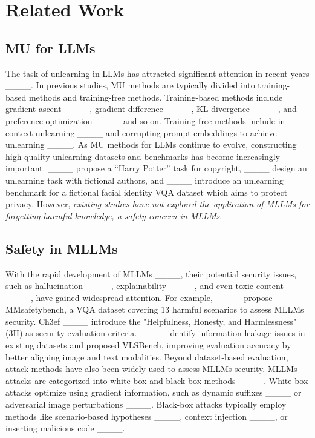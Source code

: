 \section{Related Work}
\subsection{MU for LLMs}
The task of unlearning in LLMs has attracted significant attention in recent years ____. In previous studies, MU methods are typically divided into training-based methods and training-free methods. Training-based methods include gradient ascent ____, gradient difference ____, KL divergence ____, and preference optimization ____ and so on. Training-free methods include in-context unlearning ____ and corrupting prompt embeddings to achieve unlearning ____. As MU methods for LLMs continue to evolve, constructing high-quality unlearning datasets and benchmarks has become increasingly important. ____ propose a “Harry Potter” task for copyright, ____ design an unlearning task with fictional authors, and ____ introduce an unlearning benchmark for a fictional facial identity VQA dataset which aims to protect privacy. However, \textit{existing studies have not explored the application of MLLMs for forgetting harmful knowledge, a safety concern in MLLMs}.

\subsection{Safety in MLLMs}

With the rapid development of MLLMs ____, their potential security issues, such as hallucination ____, explainability ____, and even toxic content ____, have gained widespread attention. For example, ____ propose MMsafetybench, a VQA dataset covering 13 harmful scenarios to assess MLLMs security. Ch3ef ____ introduce the "Helpfulness, Honesty, and Harmlessness" (3H) as security evaluation criteria. ____ identify information leakage issues in existing datasets and proposed VLSBench, improving evaluation accuracy by better aligning image and text modalities. Beyond dataset-based evaluation, attack methods have also been widely used to assess MLLMs security. MLLMs attacks are categorized into white-box and black-box methods ____. White-box attacks optimize using gradient information, such as dynamic suffixes ____ or adversarial image perturbations  ____. Black-box attacks typically employ methods like scenario-based hypotheses ____, context injection ____, or inserting malicious code ____.
